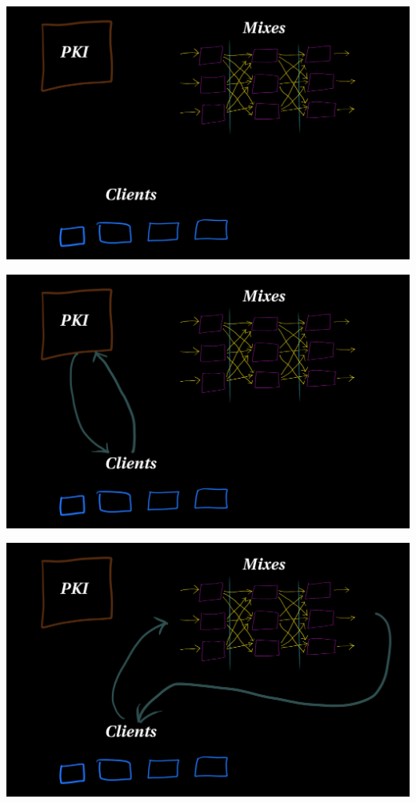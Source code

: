 \documentclass[fleqn,xcolor={usenames,dvipsnames}]{beamer} %
\begin{document}
\begin{frame}
\includegraphics[scale=.10]{pics/mixnet_architecture1}
\end{frame}

\begin{frame}
\includegraphics[scale=.10]{pics/mixnet_architecture2}
\end{frame}

\begin{frame}
\includegraphics[scale=.10]{pics/mixnet_architecture3}
\end{frame}
\end{document}
